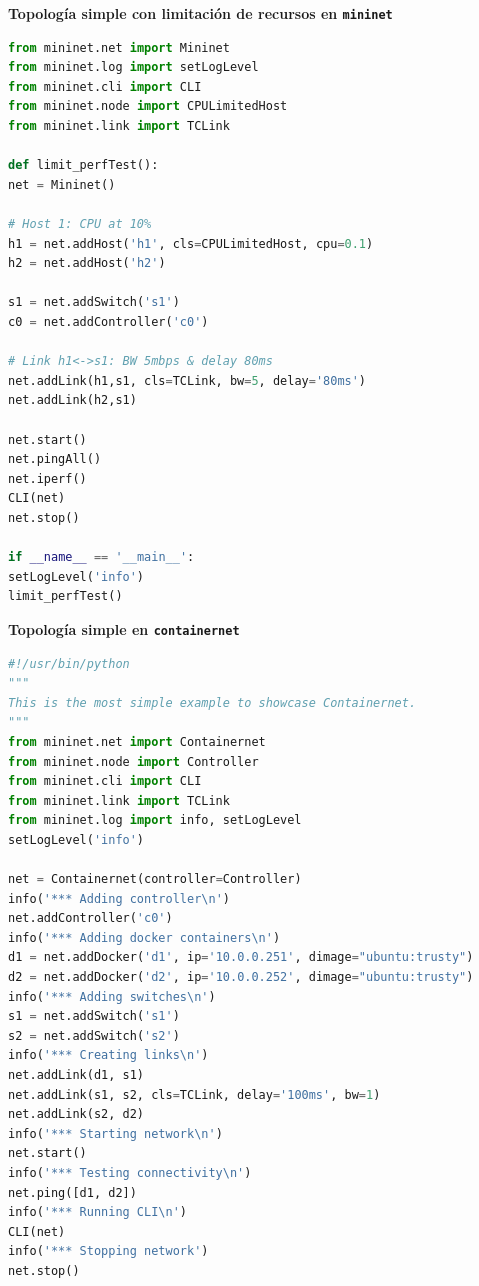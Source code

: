 \documentclass[a4paper, oneside, 12pt]{book}
\begin{document}
	\vspace{20px}
	\noindent \textbf{\large Topología simple con limitación de recursos en \texttt{mininet}}\\
	\begin{lstlisting}[language=Python, caption={Código topología simple con limitación de recursos en \texttt{mininet} (\texttt{limit.py})}, label={lst: topo simple cpu mn}]
from mininet.net import Mininet
from mininet.log import setLogLevel
from mininet.cli import CLI
from mininet.node import CPULimitedHost
from mininet.link import TCLink

def limit_perfTest():
net = Mininet()

# Host 1: CPU at 10%
h1 = net.addHost('h1', cls=CPULimitedHost, cpu=0.1)		
h2 = net.addHost('h2')

s1 = net.addSwitch('s1')
c0 = net.addController('c0')

# Link h1<->s1: BW 5mbps & delay 80ms
net.addLink(h1,s1, cls=TCLink, bw=5, delay='80ms')
net.addLink(h2,s1)

net.start()
net.pingAll()
net.iperf()
CLI(net)
net.stop()

if __name__ == '__main__':
setLogLevel('info')
limit_perfTest()
	\end{lstlisting}


	\vspace{20px}
	\noindent \textbf{\large Topología simple en \texttt{containernet}}\\
		\begin{lstlisting}[language=Python, caption={Código topologia simple en \texttt{containernet} (\texttt{containernet\_example.py})}, label={lst: topo simple containernet}]
#!/usr/bin/python
"""
This is the most simple example to showcase Containernet.
"""
from mininet.net import Containernet
from mininet.node import Controller
from mininet.cli import CLI
from mininet.link import TCLink
from mininet.log import info, setLogLevel
setLogLevel('info')
		
net = Containernet(controller=Controller)
info('*** Adding controller\n')
net.addController('c0')
info('*** Adding docker containers\n')
d1 = net.addDocker('d1', ip='10.0.0.251', dimage="ubuntu:trusty")
d2 = net.addDocker('d2', ip='10.0.0.252', dimage="ubuntu:trusty")
info('*** Adding switches\n')
s1 = net.addSwitch('s1')
s2 = net.addSwitch('s2')
info('*** Creating links\n')
net.addLink(d1, s1)
net.addLink(s1, s2, cls=TCLink, delay='100ms', bw=1)
net.addLink(s2, d2)
info('*** Starting network\n')
net.start()
info('*** Testing connectivity\n')
net.ping([d1, d2])
info('*** Running CLI\n')
CLI(net)
info('*** Stopping network')
net.stop()
	\end{lstlisting}
	
	
\end{document}
